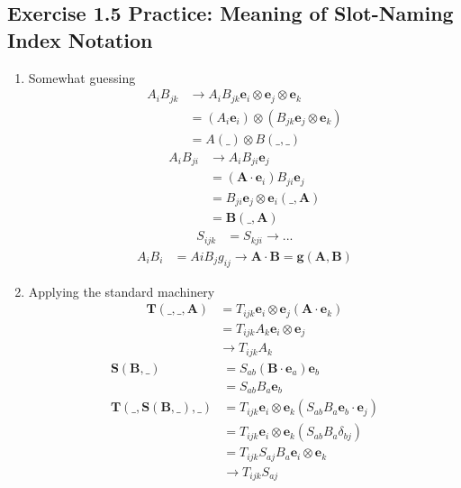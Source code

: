 \documentclass[10pt,a4paper]{book}
\theoremstyle{definition}
\begin{document}
\subsection{Exercise 1.5 Practice: Meaning of Slot-Naming Index Notation}
\begin{enumerate}[label=(\alph*)]
\item Somewhat guessing
\begin{align}
    A_iB_{jk}
    &\rightarrow A_iB_{jk}\mathbf{e}_i\otimes\mathbf{e}_j\otimes\mathbf{e}_k\\
    &= (A_i\mathbf{e}_i)\otimes (B_{jk}\mathbf{e}_j\otimes\mathbf{e}_k)\\
    &=A(\_)\otimes B(\_,\_)
\end{align}
\begin{align}
    A_iB_{ji}
    &\rightarrow A_iB_{ji}\mathbf{e}_j\\
    &=(\mathbf{A}\cdot\mathbf{e}_i)B_{ji}\mathbf{e}_j\\
    &=B_{ji}\mathbf{e}_j\otimes\mathbf{e}_i(\_,\mathbf{A})\\
    &=\mathbf{B}(\_,\mathbf{A})
\end{align}
\begin{align}
    S_{ijk}
    &=S_{kji}\rightarrow ...
\end{align}
\begin{align}
    A_iB_i&=AiB_jg_{ij}\rightarrow \mathbf{A}\cdot\mathbf{B}=\mathbf{g}(\mathbf{A},\mathbf{B})
\end{align}

\item Applying the standard machinery
\begin{align}
    \mathbf{T}(\_,\_,\mathbf{A})
    &=T_{ijk}\mathbf{e}_i\otimes\mathbf{e}_j(\mathbf{A}\cdot\mathbf{e}_k)\\
    &=T_{ijk}A_k\mathbf{e}_i\otimes\mathbf{e}_j\\
    &\rightarrow T_{ijk}A_k
\end{align}
\begin{align}
    \mathbf{S}(\mathbf{B},\_)
    &=S_{ab}(\mathbf{B}\cdot\mathbf{e}_a)\mathbf{e}_b\\
    &=S_{ab}B_a\mathbf{e}_b\\
    \mathbf{T}(\_,\mathbf{S}(\mathbf{B},\_),\_)
    &=T_{ijk}\mathbf{e}_i\otimes\mathbf{e}_k(S_{ab}B_a\mathbf{e}_b\cdot\mathbf{e}_j)\\
    &=T_{ijk}\mathbf{e}_i\otimes\mathbf{e}_k(S_{ab}B_a\delta_{bj})\\
    &=T_{ijk}S_{aj}B_a\mathbf{e}_i\otimes\mathbf{e}_k\\
    &\rightarrow T_{ijk}S_{aj}
\end{align}
\end{enumerate}
\end{document}
